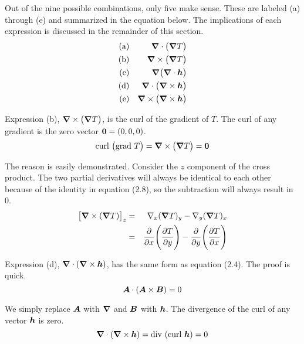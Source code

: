 Out of the nine possible combinations, only five make sense.
These are labeled (a) through (e) and summarized in the equation below.
The implications of each expression is discussed in the remainder of this section.
\begin{eqnarray}
  \mathrm{(a)} & & \boldsymbol{\nabla} \cdot \big( \boldsymbol{\nabla} T \big) \nonumber \\
  \mathrm{(b)} & & \boldsymbol{\nabla} \times \big( \boldsymbol{\nabla} T \big) \nonumber \\
  \mathrm{(c)} & & \boldsymbol{\nabla} \big( \boldsymbol{\nabla} \cdot \boldsymbol{h} \big) \\
  \mathrm{(d)} & & \boldsymbol{\nabla} \cdot \big( \boldsymbol{\nabla} \times \boldsymbol{h} \big) \nonumber \\
  \mathrm{(e)} & & \boldsymbol{\nabla} \times \big( \boldsymbol{\nabla} \times \boldsymbol{h} \big) \nonumber
\end{eqnarray}

Expression (b), $\boldsymbol{\nabla} \times \big( \boldsymbol{\nabla} T \big)$, is the curl of the gradient of $T$.
The curl of any gradient is the zero vector $\boldsymbol{0} = (0,0,0)$.
\begin{equation}
  \mathrm{curl\ } \big( \mathrm{grad\ } T \big) = \boldsymbol{\nabla} \times \big( \boldsymbol{\nabla} T \big) = \boldsymbol{0}
\end{equation}

The reason is easily demonstrated.
Consider the $z$ component of the cross product.
The two partial derivatives will always be identical to each other
because of the identity in equation (2.8), so the subtraction will always result in 0.
\begin{eqnarray}
  \big[ \boldsymbol{\nabla} \times (\boldsymbol{\nabla} T) \big]_z
  &=& \nabla_x (\boldsymbol{\nabla} T)_y - \nabla_y (\boldsymbol{\nabla} T)_x \nonumber \\
  &=& \frac{\partial }{\partial x} \Bigg( \frac{\partial T}{\partial y} \Bigg) - \frac{\partial }{\partial y} \Bigg( \frac{\partial T}{\partial x} \Bigg)
\end{eqnarray}

Expression (d), $\boldsymbol{\nabla} \cdot (\boldsymbol{\nabla} \times \boldsymbol{h})$, has the same form as equation (2.4).
The proof is quick.
\begin{equation}
  \boldsymbol{A} \cdot (\boldsymbol{A} \times \boldsymbol{B}) = 0
\end{equation}

We simply replace $\boldsymbol{A}$ with $\boldsymbol{\nabla}$ and $\boldsymbol{B}$ with $\boldsymbol{h}$.
The divergence of the curl of any vector $\boldsymbol{h}$ is zero.
\begin{equation}
  \grad \cdot (\grad \times \bv{h}) = \mathrm{div\ } (\mathrm{curl\ } \bv{h}) = 0
\end{equation}

